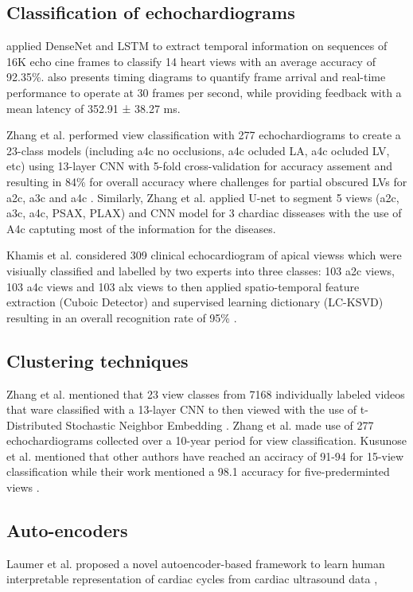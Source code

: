 \subsection{Classification of echochardiograms}

\cite{woudenberg2018} applied DenseNet and LSTM to extract temporal information on sequences of 16K echo cine frames to classify 14 heart views with an average accuracy of 92.35\%.
\cite{woudenberg2018} also presents timing diagrams to quantify frame arrival and real-time performance to operate at 30 frames per second, while providing feedback with a mean latency of 352.91 ± 38.27 ms.

Zhang et al. performed view classification with 277 echochardiograms to create a 23-class models (including a4c no occlusions, a4c ocluded LA, a4c ocluded LV, etc) using 13-layer CNN with 5-fold cross-validation for accuracy assement and resulting in 84\% for overall accuracy where challenges for partial obscured LVs for a2c, a3c and a4c \cite{zhang2018}.
Similarly, Zhang et al. applied U-net to segment 5 views (a2c, a3c, a4c, PSAX, PLAX) and CNN model for 3 chardiac disseases with the use of A4c captuting most of the information for the diseases.


Khamis et al. considered 309 clinical echocardiogram of apical viewss which were visiually classified and labelled by two experts into three classes: 103 a2c views, 103 a4c views and 103 alx views to then applied spatio-temporal feature extraction (Cuboic Detector) and supervised learning dictionary (LC-KSVD) resulting in an overall recognition rate of 95\% \cite{khamis2017}.


\subsection{Clustering techniques}
Zhang et al. mentioned that 23 view classes from 7168 individually labeled videos that ware classified with a 13-layer CNN to then viewed with the use of t-Distributed Stochastic Neighbor Embedding \cite{zhang2018}.
Zhang et al. made use of 277 echochardiograms collected over a 10-year period for view classification.
Kusunose et al. mentioned that other authors have reached an acciracy of 91-94 for 15-view classification while their work mentioned a 98.1 accuracy for five-prederminted views \cite{kusunose2021}.

\subsection{Auto-encoders}
Laumer et al. proposed a novel autoencoder-based framework to learn human interpretable representation of cardiac cycles from cardiac ultrasound data \cite{laumer2020},

